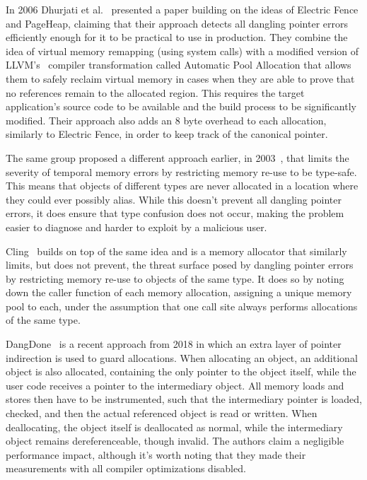 In 2006 Dhurjati et al.~\cite{dhurjati2006efficiently} presented a paper building on the ideas of Electric Fence and PageHeap, claiming that their approach detects all dangling pointer errors efficiently enough for it to be practical to use in production. They combine the idea of virtual memory remapping (using system calls) with a modified version of LLVM's~\cite{llvm-web} compiler transformation called Automatic Pool Allocation that allows them to safely reclaim virtual memory in cases when they are able to prove that no references remain to the allocated region. This requires the target application's source code to be available and the build process to be significantly modified. Their approach also adds an 8 byte overhead to each allocation, similarly to Electric Fence, in order to keep track of the canonical pointer.

The same group proposed a different approach earlier, in 2003~\cite{dhurjati2003memory}, that limits the severity of temporal memory errors by restricting memory re-use to be type-safe. This means that objects of different types are never allocated in a location where they could ever possibly alias. While this doesn't prevent all dangling pointer errors, it does ensure that type confusion does not occur, making the problem easier to diagnose and harder to exploit by a malicious user.

Cling~\cite{akritidis2010cling} builds on top of the same idea and is a memory allocator that similarly limits, but does not prevent, the threat surface posed by dangling pointer errors by restricting memory re-use to objects of the same type. It does so by noting down the caller function of each memory allocation, assigning a unique memory pool to each, under the assumption that one call site always performs allocations of the same type.

DangDone~\cite{dangdone2018} is a recent approach from 2018 in which an extra layer of pointer indirection is used to guard allocations. When allocating an object, an additional object is also allocated, containing the only pointer to the object itself, while the user code receives a pointer to the intermediary object. All memory loads and stores then have to be instrumented, such that the intermediary pointer is loaded, checked, and then the actual referenced object is read or written. When deallocating, the object itself is deallocated as normal, while the intermediary object remains dereferenceable, though invalid. The authors claim a negligible performance impact, although it's worth noting that they made their measurements with all compiler optimizations disabled.

